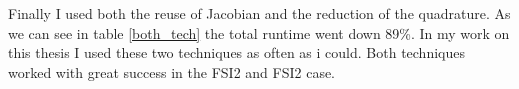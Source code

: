 Finally I used both the reuse of Jacobian and the reduction of the quadrature. As we can see in table \ref{both_tech} the total runtime went down 89\%. In my work on this thesis I used these two techniques as often as i could. Both techniques worked with great success in the FSI2 and FSI2 case.






